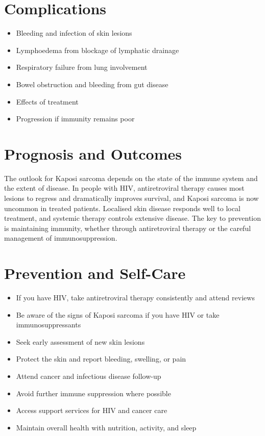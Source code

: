 \section*{Complications}
\begin{itemize}
    \item Bleeding and infection of skin lesions
    \item Lymphoedema from blockage of lymphatic drainage
    \item Respiratory failure from lung involvement
    \item Bowel obstruction and bleeding from gut disease
    \item Effects of treatment
    \item Progression if immunity remains poor
\end{itemize}

\section*{Prognosis and Outcomes}
The outlook for Kaposi sarcoma depends on the state of the immune system and the extent of disease. In people with HIV, antiretroviral therapy causes most lesions to regress and dramatically improves survival, and Kaposi sarcoma is now uncommon in treated patients. Localised skin disease responds well to local treatment, and systemic therapy controls extensive disease. The key to prevention is maintaining immunity, whether through antiretroviral therapy or the careful management of immunosuppression.

\section*{Prevention and Self-Care}
\begin{itemize}
    \item If you have HIV, take antiretroviral therapy consistently and attend reviews
    \item Be aware of the signs of Kaposi sarcoma if you have HIV or take immunosuppressants
    \item Seek early assessment of new skin lesions
    \item Protect the skin and report bleeding, swelling, or pain
    \item Attend cancer and infectious disease follow-up
    \item Avoid further immune suppression where possible
    \item Access support services for HIV and cancer care
    \item Maintain overall health with nutrition, activity, and sleep
\end{itemize}

